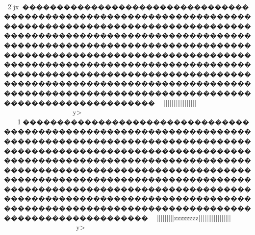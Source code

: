 {{{{{{{{{{{{{{{{{{{{{{{{{{{{{{{{{{{{{{{{{{{{{{{{{{{{{{{{{{{{{{{{{{{{{{{{{{{{{{{{{{{{{{{{{{{{{{{{{{{{{{{{{{{{{{{{{{{{{{{{{{{{{{{{{{{{{{{{{{{{{{{{{{{{{{{{{{{{{{{{{{{{{{{{{{{{{{{{{{{{{{{{{{{{{{{{{{{{{{{{{{{{{{{{{{{{{{{{{{{{{{{{{{{{{{{{{{{{{{{{{{{{{{{{{{{{{{{{{{{{{{{{{{{{{{{{{{{{{{{{{{{{{{{{{{{{{{{{{{{{{{{{{{{{{{{{{{{{{{{{{{{{{{{{{{{{{{{{{{{{{{{{{{{{{{{{{{{{{{{{{{{{{{{{{{{{{{{{{{{{{{{{{{{{{{{{{{{{{{{{{{{{{{{{{{{{{{{{{{{{{{{{{{{{{{{{{{{{{{{{{{{{{{{{{{{{{{{{{{{{{{{{{{{{{{{{{{{{{{{{{{{{{{{{{{{{{{{{{{{{{{{{{{{{{{{{{{{{{{{{{{{{{{{{{{{{{{{{{{{{{{{{{{{{{{{{{{{{{{{{{{{{{{{{{{{{{{{{{{{{{{{{{{{{{{{{{{{{{{{{{{{{{{{{{{{{{{{{{{{{{{{{{{{{{{{{{{{{{{{{{{{{{{{{{{{{{{{{{{{{{{{{{{{{{{{{{{{{{{{{{{{{{{{{{{{{{{{{{{{{{{{{{{{{{{{{{{{{{{{{{{{{{{{{{{{{{{{{{{{{{{{{{{{{{{{{{{{{{{{{{{{{{{{{{{{{{{{{{{{{{{{{{{{{{{{{{{{{{{{{{{{{{{{{{{{{{{{{{{{{{{{{{{{{{{{{{{{{{{{{{{{{{{{{{{{{{{{{{{{{{{{{{{{{{{{{{{{{{{{{{{{{{{{{{{{{{{{{{{{{{{{{{{{{{{{{{{{{{{{{{{{{{{{{{{{{{{{{{{{{{{{{{{{{{{{{{{{{{{{{{{{{{{{{{{{{{{{{{{{{{{{{{{{{{{{{{{{{{{{{{{{{{{				2]jx~�������������������������������������������������������������������������������������������������������������������������������������������������������������������������������������������������������������������������������������������������������������������������������������������������������������������������������������������������������������������������������������������~~}||||||{{{{{{{{{{{{{{{{{{{{{{{{{{|||{||||||}}}}}}}}||}}}~~~~~~~~~~~~~~~y>
1\ky������������������������������������������������������������������������������������������������������������������������������������������������������������������������������������������������������������������������������������������������������������������������������������������������������������������������������������������������������������������������������������������~~}}|}}}}}||||||||{{{{{{{{zzzzzzzz{{||||||{|||||||||||}}}}~~~~~~~~~~~~~~~~y>
}}}}}}}}}}}}}}}}}}}}}}}}}}}}}}}}}}}}}}}}}}}}}}}}}}}}}}}}}}}}}}}}}}}}}}}}}}}}}}}}}}}}}}}}}}}}}}}}}}}}}}}}}}}}}}}}}}}}}}}}}}}}}}}}}}}}}}}}}}}}}}}}}}}}}}}}}}}}}}}}}}}}}}}}}}}}}}}}}}}}}}}}}}}}}}}}}}}}}}}}}}}}}}}}}}}}}}}}}}}}}}}}}}}}}}}}}}}}}}}}}}}}}}}}}}}}}}}}}}}}}}}}}}}}}}}}}}}}}}}}}}}}}}}}}}}}}}}}}}}}}}}}}}}}}}}}}}}}}}}}}}}}}}}}}}}}}}}}}}}}}}}}}}}}}}}}}}}}}}}}}}}}}}}}}}}}}}}}}}}}}}}}}}}}}}}}}}}}}}}}}}}}}}}}}}}}}}}}}}}}}}}}}}}}}}}}}}}}}}}}}}}}}}}}}}}}}}}}}}}}}}}}}}}}}}}}}}}}}}}}}}}}}}}}}}}}}}}}}}}}}}}}}}}}}}}}}}}}}}}}}}}}}}}}}}}}}}}}}}}}}}}}}}}}}}}}}}}}}}}}}}}}}}}}}}}}}}}}}}}}}}}}}}}}}}}}}}}}}}}}}}}}}}}}}}}}}}}}}}}}}}}}}}}}}}}}}}}}}}}}}}}}}}}}}}}}}}}}}}}}}}}}}}}}}}}}}}}}}}}}}}}}}}}}}}}}}}}}}}}}}}}}}}}}}}}}}}}}}}}}}}}}}}}}}}}}}}}}}}}}}}}}}}}}}}}}}}}}}}}}}}}}}}}}}}}}}}}}}}}}}}}}}}}}}}}}}}}}}}}}}}}}}}}}}}}}}}}}}}}}}}}}}}}}}}}}}}}}}}}}}}}}}}}}}}}}}}}}}}}}}}}}}}}}}}}}}}}}}}}}}}}}}}}}}}}}}}}}}}}}}}}}}}}}}}}}}}}}}}}}}}}}}}}}}}}}}}}}}}}}}}}}}}}}}}}}}}}}}}}}}}}}}}}}}}}}}}}}}}}}}}}}}}}}}}}}}}}}}}}}}}}}}}}}}}}}}}}}}}}}}
